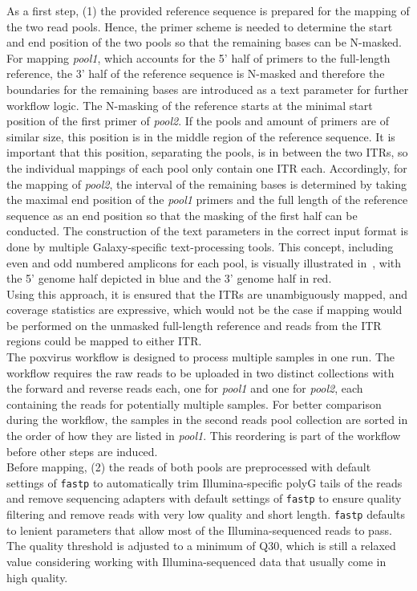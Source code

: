 As a first step, (1) the provided reference sequence is prepared for the mapping of the two read pools. Hence, the primer scheme is needed to determine the start and end position of the two pools so that the remaining bases can be N-masked. For mapping \textit{pool1}, which accounts for the 5' half of primers to the full-length reference, the 3' half of the reference sequence is N-masked and therefore the boundaries for the remaining bases are introduced as a text parameter for further workflow logic. The N-masking of the reference starts at the minimal start position of the first primer of \textit{pool2}. If the pools and amount of primers are of similar size, this position is in the middle region of the reference sequence. It is important that this position, separating the pools, is in between the two \acp{ITR}, so the individual mappings of each pool only contain one \ac{ITR} each. Accordingly, for the mapping of \textit{pool2}, the interval of the remaining bases is determined by taking the maximal end position of the \textit{pool1} primers and the full length of the reference sequence as an end position so that the masking of the first half can be conducted. The construction of the text parameters in the correct input format is done by multiple Galaxy-specific text-processing tools. This concept, including even and odd numbered amplicons for each pool, is visually illustrated in~, with the 5' genome half depicted in blue and the 3' genome half in red. \\
Using this approach, it is ensured that the \acp{ITR} are unambiguously mapped, and coverage statistics are expressive, which would not be the case if mapping would be performed on the unmasked full-length reference and reads from the \ac{ITR} regions could be mapped to either \ac{ITR}.\\
The poxvirus workflow is designed to process multiple samples in one run. The workflow requires the raw reads to be uploaded in two distinct collections with the forward and reverse reads each, one for \textit{pool1} and one for \textit{pool2}, each containing the reads for potentially multiple samples. For better comparison during the workflow, the samples in the second reads pool collection are sorted in the order of how they are listed in \textit{pool1}. This reordering is part of the workflow before other steps are induced.\\
Before mapping, (2) the reads of both pools are preprocessed with default settings of \texttt{fastp} to automatically trim Illumina-specific polyG tails of the reads and remove sequencing adapters with default settings of \texttt{fastp} to ensure quality filtering and remove reads with very low quality and short length. \texttt{fastp} defaults to lenient parameters that allow most of the Illumina-sequenced reads to pass. The quality threshold is adjusted to a minimum of Q30, which is still a relaxed value considering working with Illumina-sequenced data that usually come in high quality.\\
